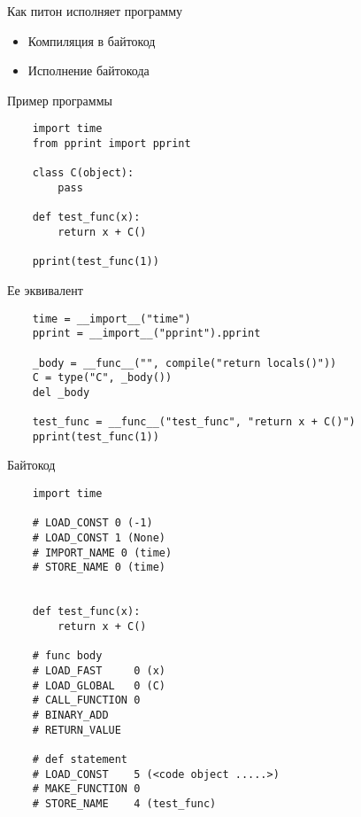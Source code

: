 \documentclass{article}
\begin{document}
\LARGE

\begin{center} Как питон исполняет программу \end{center}
\begin{itemize}
	\item Компиляция в байтокод
	\item Исполнение байтокода
\end{itemize}
\newpage

\begin{center} Пример программы \end{center}
\begin{lstlisting}
    import time
    from pprint import pprint
    
    class C(object):
        pass
        
    def test_func(x):
        return x + C()
    
    pprint(test_func(1))
\end{lstlisting}
\newpage

\begin{center} Ее эквивалент \end{center}
\begin{lstlisting}
    time = __import__("time")
    pprint = __import__("pprint").pprint    
    
    _body = __func__("", compile("return locals()"))
    C = type("C", _body())    
    del _body         
    
    test_func = __func__("test_func", "return x + C()")    
    pprint(test_func(1))
\end{lstlisting}
\newpage

\begin{center} Байтокод \end{center}
\begin{lstlisting}
    import time
    
    # LOAD_CONST 0 (-1)
    # LOAD_CONST 1 (None)
    # IMPORT_NAME 0 (time)
    # STORE_NAME 0 (time)
    

    def test_func(x):
        return x + C()
        
    # func body
    # LOAD_FAST     0 (x)
    # LOAD_GLOBAL   0 (C)
    # CALL_FUNCTION 0
    # BINARY_ADD          
    # RETURN_VALUE        

    # def statement
    # LOAD_CONST    5 (<code object .....>)
    # MAKE_FUNCTION 0
    # STORE_NAME    4 (test_func)    
\end{lstlisting}
\newpage
\end{document}
